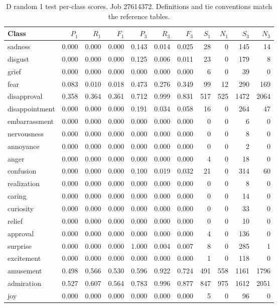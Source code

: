 \begin{table}[!htbp]
\centering
\scriptsize
\setlength{\tabcolsep}{5pt}
\begin{tabular}{lrrrrrrrrrr}
\toprule
Class & $P_1$ & $R_1$ & $F_1$ & $P_3$ & $R_3$ & $F_3$ & $S_1$ & $N_1$ & $S_3$ & $N_3$ \\
\midrule
sadness & 0.000 & 0.000 & 0.000 & 0.143 & 0.014 & 0.025 & 28 & 0 & 145 & 14 \\
disgust & 0.000 & 0.000 & 0.000 & 0.125 & 0.006 & 0.011 & 23 & 0 & 179 & 8 \\
grief & 0.000 & 0.000 & 0.000 & 0.000 & 0.000 & 0.000 & 6 & 0 & 39 & 0 \\
fear & 0.083 & 0.010 & 0.018 & 0.473 & 0.276 & 0.349 & 99 & 12 & 290 & 169 \\
disapproval & 0.358 & 0.364 & 0.361 & 0.712 & 0.999 & 0.831 & 517 & 525 & 1472 & 2064 \\
disappointment & 0.000 & 0.000 & 0.000 & 0.191 & 0.034 & 0.058 & 16 & 0 & 264 & 47 \\
embarrassment & 0.000 & 0.000 & 0.000 & 0.000 & 0.000 & 0.000 & 0 & 0 & 6 & 0 \\
nervousness & 0.000 & 0.000 & 0.000 & 0.000 & 0.000 & 0.000 & 0 & 0 & 8 & 0 \\
annoyance & 0.000 & 0.000 & 0.000 & 0.000 & 0.000 & 0.000 & 0 & 0 & 2 & 0 \\
anger & 0.000 & 0.000 & 0.000 & 0.000 & 0.000 & 0.000 & 4 & 0 & 18 & 0 \\
confusion & 0.000 & 0.000 & 0.000 & 0.100 & 0.019 & 0.032 & 21 & 0 & 314 & 60 \\
realization & 0.000 & 0.000 & 0.000 & 0.000 & 0.000 & 0.000 & 0 & 0 & 8 & 0 \\
caring & 0.000 & 0.000 & 0.000 & 0.000 & 0.000 & 0.000 & 0 & 0 & 14 & 0 \\
curiosity & 0.000 & 0.000 & 0.000 & 0.000 & 0.000 & 0.000 & 0 & 0 & 33 & 0 \\
relief & 0.000 & 0.000 & 0.000 & 0.000 & 0.000 & 0.000 & 0 & 0 & 10 & 0 \\
approval & 0.000 & 0.000 & 0.000 & 0.000 & 0.000 & 0.000 & 4 & 0 & 136 & 0 \\
surprise & 0.000 & 0.000 & 0.000 & 1.000 & 0.004 & 0.007 & 8 & 0 & 285 & 1 \\
excitement & 0.000 & 0.000 & 0.000 & 0.000 & 0.000 & 0.000 & 1 & 0 & 118 & 0 \\
amusement & 0.498 & 0.566 & 0.530 & 0.596 & 0.922 & 0.724 & 491 & 558 & 1161 & 1796 \\
admiration & 0.527 & 0.607 & 0.564 & 0.783 & 0.996 & 0.877 & 847 & 975 & 1612 & 2051 \\
joy & 0.000 & 0.000 & 0.000 & 0.000 & 0.000 & 0.000 & 5 & 0 & 96 & 0 \\
\bottomrule
\end{tabular}
\caption{D random 1 test per-class scores. Job 27614372. Definitions and tie conventions match the reference tables.}
\label{tab:classes-d_random_k1}
\end{table}
